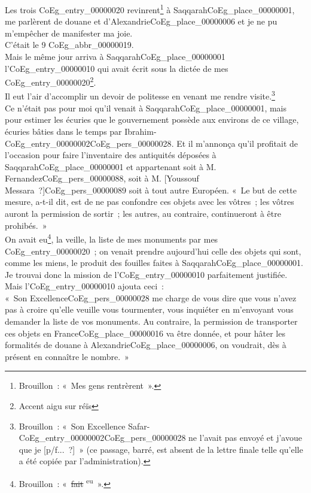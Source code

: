 \documentclass{book}
\begin{document}
\indent Les trois \gls{CoEg_entry_00000020} revinrent\footnote{Brouillon~: «~Mes gens rentrèrent~».} à Saqqarah\gls{CoEg_place_00000001}, me parlèrent de douane et d’Alexandrie\gls{CoEg_place_00000006} et je ne pu m’empêcher de manifester ma joie.\\
\indent C’était le 9 \gls{CoEg_abbr_00000019}.\\
\indent Mais le même jour arriva à Saqqarah\gls{CoEg_place_00000001} l’\gls{CoEg_entry_00000010} qui avait écrit sous la dictée de mes \gls{CoEg_entry_00000020}\footnote{Accent aigu sur réïs}.\\
\indent Il eut l’air d’accomplir un devoir de politesse en venant me rendre visite.\footnote{Brouillon~: «~Son Excellence Safar-\Gls{CoEg_entry_00000002}\gls{CoEg_pers_00000028} ne l’avait pas envoyé et j’avoue que je [p/f...~?]~» (ce passage, barré, est absent de la lettre finale telle qu’elle a été copiée par l’administration).}\\
\indent Ce n’était pas pour moi qu’il venait à Saqqarah\gls{CoEg_place_00000001}, mais pour estimer les écuries que le gouvernement possède aux environs de ce village, écuries bâties dans le temps par Ibrahim-\Gls{CoEg_entry_00000002}\gls{CoEg_pers_00000028}. Et il m’annonça qu’il profitait de l’occasion pour faire l’inventaire des antiquités déposées à Saqqarah\gls{CoEg_place_00000001} et appartenant soit à M. Fernandez\gls{CoEg_pers_00000088}, soit à M. [Youssouf Messara~?]\gls{CoEg_pers_00000089} soit à tout autre Européen. «~Le but de cette mesure, a-t-il dit, est de ne pas confondre ces objets avec les vôtres~; les vôtres auront la permission de sortir~; les autres, au contraire, continueront à être prohibés.~»\\
\indent On avait eu\footnote{Brouillon~: «~\sout{fait} \textsuperscript{eu}~».}, la veille, la liste de mes monuments par mes \gls{CoEg_entry_00000020}~; on venait prendre aujourd’hui celle des objets qui sont, comme les miens, le produit des fouilles faites à Saqqarah\gls{CoEg_place_00000001}. Je trouvai donc la mission de l’\Gls{CoEg_entry_00000010} parfaitement justifiée.\\
\indent Mais l’\Gls{CoEg_entry_00000010} ajouta ceci~:\\
\indent «~Son Excellence\gls{CoEg_pers_00000028} me charge de vous dire que vous n’avez pas à croire qu’elle veuille vous tourmenter, vous inquiéter en m’envoyant vous demander la liste de vos monuments. Au contraire, la permission de transporter ces objets en France\gls{CoEg_place_00000016} va être donnée, et pour hâter les formalités de douane à Alexandrie\gls{CoEg_place_00000006}, on voudrait, dès à présent en connaître le nombre.~»\\
\end{document}

